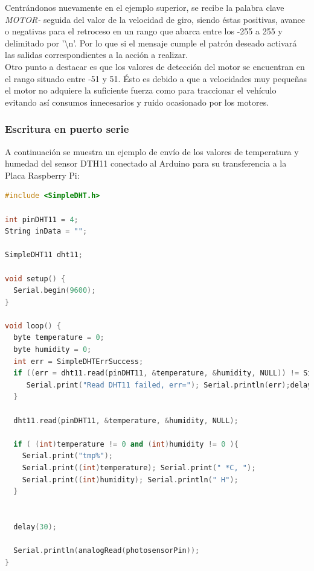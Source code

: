 Centrándonos nuevamente en el ejemplo superior, se recibe la palabra clave \emph{MOTOR-} seguida del valor de la velocidad de giro, siendo éstas positivas, avance o negativas para el retroceso en un rango
que abarca entre los -255 a 255 y delimitado por '\textbackslash n'. Por lo que si el mensaje cumple el patrón deseado activará las salidas correspondientes a la acción a realizar.\\

Otro punto a destacar es que los valores de detección del motor se encuentran en el rango situado entre -51 y 51. Ésto es debido a que a velocidades muy pequeñas el motor no adquiere la
suficiente fuerza como para traccionar el vehículo evitando así consumos innecesarios y ruido ocasionado por los motores.\\

\subsubsection{Escritura en puerto serie}

A continuación se muestra un ejemplo de envío de los valores de temperatura y humedad del sensor DTH11 conectado al Arduino para su transferencia a la Placa Raspberry Pi:\\

\begin{lstlisting}[language=C++]
#include <SimpleDHT.h>

int pinDHT11 = 4;
String inData = "";

SimpleDHT11 dht11;

void setup() {
  Serial.begin(9600);
}

void loop() {
  byte temperature = 0;
  byte humidity = 0;
  int err = SimpleDHTErrSuccess;
  if ((err = dht11.read(pinDHT11, &temperature, &humidity, NULL)) != SimpleDHTErrSuccess) {
     Serial.print("Read DHT11 failed, err="); Serial.println(err);delay(1000);
  }

  dht11.read(pinDHT11, &temperature, &humidity, NULL);

  if ( (int)temperature != 0 and (int)humidity != 0 ){
    Serial.print("tmp%");
    Serial.print((int)temperature); Serial.print(" *C, ");
    Serial.print((int)humidity); Serial.println(" H");
  }

  
  delay(30);

  Serial.println(analogRead(photosensorPin));
}

\end{lstlisting}

